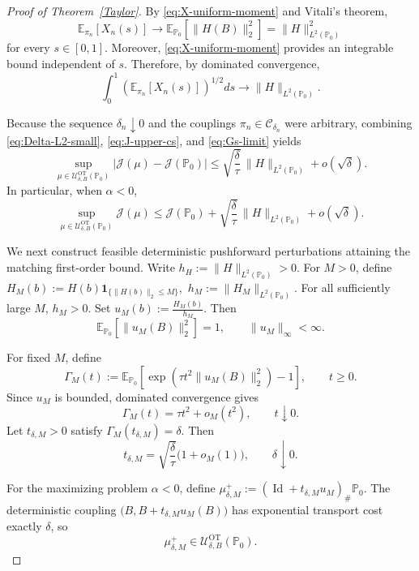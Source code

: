 \documentclass[11pt]{article}
\theoremstyle{definition}
\newcommand{\E}{\mathbb{E}}
\begin{document}
\begin{proof}[Proof of Theorem~\ref{Taylor}]
By \eqref{eq:X-uniform-moment} and Vitali's theorem,
\[
\E_{\pi_n}[X_n(s)]
\longrightarrow
\E_{\mathbb P_0}
\left[
\|H(B)\|_2^2
\right]
=
\|H\|_{L^2(\mathbb P_0)}^2
\]
for every $s\in[0,1]$. Moreover,
\eqref{eq:X-uniform-moment} provides an integrable bound independent of
$s$. Therefore, by dominated convergence,
\begin{equation}\label{eq:Gs-limit}
\int_0^1
\left(
\E_{\pi_n}[X_n(s)]
\right)^{1/2}
ds
\longrightarrow
\|H\|_{L^2(\mathbb P_0)}.
\end{equation}

Because the sequence $\delta_n\downarrow0$ and the couplings
$\pi_n\in\mathcal C_{\delta_n}$ were arbitrary, combining
\eqref{eq:Delta-L2-small}, \eqref{eq:J-upper-cs}, and
\eqref{eq:Gs-limit} yields
\begin{equation}\label{eq:uniform-two-sided-bound}
\sup_{\mu\in
\mathcal U_{\delta,B}^{\mathrm{OT}}(\mathbb P_0)}
\left|
\mathcal J(\mu)-\mathcal J(\mathbb P_0)
\right|
\le
\sqrt{\frac{\delta}{\tau}}\,
\|H\|_{L^2(\mathbb P_0)}
+
o(\sqrt{\delta}).
\end{equation}
In particular, when $\alpha<0$,
\begin{equation}\label{eq:sup-upper-bound}
\sup_{\mu\in
\mathcal U_{\delta,B}^{\mathrm{OT}}(\mathbb P_0)}
\mathcal J(\mu)
\le
\mathcal J(\mathbb P_0)
+
\sqrt{\frac{\delta}{\tau}}\,
\|H\|_{L^2(\mathbb P_0)}
+
o(\sqrt{\delta}).
\end{equation}

We next construct feasible deterministic pushforward perturbations
attaining the matching first-order bound. Write $h_H:=\|H\|_{L^2(\mathbb P_0)}>0.$
For $M>0$, define $H_M(b)
:=
H(b)\mathbf 1_{\{\|H(b)\|_2\le M\}},$ $h_M
:=
\|H_M\|_{L^2(\mathbb P_0)}.$
For all sufficiently large $M$, $h_M>0$. Set $u_M(b)
:=
\frac{H_M(b)}{h_M}.$
Then
\[
\E_{\mathbb P_0}
\left[
\|u_M(B)\|_2^2
\right]
=1,
\qquad
\|u_M\|_\infty<\infty.
\]

For fixed $M$, define
\[
\Gamma_M(t)
:=
\E_{\mathbb P_0}
\left[
\exp\!\left(
\tau t^2\|u_M(B)\|_2^2
\right)-1
\right],
\qquad
t\ge0.
\]
Since $u_M$ is bounded, dominated convergence gives
\[
\Gamma_M(t)
=
\tau t^2+o_M(t^2),
\qquad
t\downarrow0.
\]
Let $t_{\delta,M}>0$ satisfy $\Gamma_M(t_{\delta,M})=\delta.$
Then
\begin{equation}\label{eq:t-delta-M}
t_{\delta,M}
=
\sqrt{\frac{\delta}{\tau}}
\bigl(1+o_M(1)\bigr),
\qquad
\delta\downarrow0.
\end{equation}

For the maximizing problem $\alpha<0$, define $\mu_{\delta,M}^{+}
:=
(\operatorname{Id}+t_{\delta,M}u_M)_\#
\mathbb P_0.$
The deterministic coupling $\bigl(B,B+t_{\delta,M}u_M(B)\bigr)$
has exponential transport cost exactly $\delta$, so
\[
\mu_{\delta,M}^{+}
\in
\mathcal U_{\delta,B}^{\mathrm{OT}}(\mathbb P_0).
\]


\end{proof}
\end{document}
